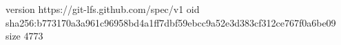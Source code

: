 version https://git-lfs.github.com/spec/v1
oid sha256:b773170a3a961c96958bd4a1ff7dbf59ebcc9a52e3d383cf312ce767f0a6be09
size 4773
